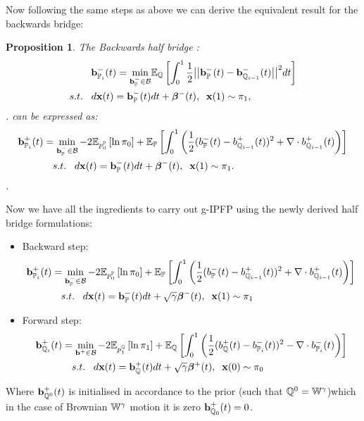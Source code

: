 \documentclass[a4paper,12pt,twoside,openright]{report}
\newtheorem{proposition}{Proposition}
\theoremstyle{definition}
\begin{document}
Now following the same steps as above we can derive the equivalent result for the backwards bridge:
\begin{proposition}
The Backwards half bridge :
\begin{align*} 
   {\mathbf{b}}^{-}_{{\mathbb{P}}_{i}}(t) =\min_{{\mathbf{b}}_{{\mathbb{P}}}^{-} \in {\mathcal{B}} } & \mathbb{E}_{\mathbb{Q}}\left[\int_0^1 \frac{1}{2}\big|\big|{\mathbf{b}}_{\mathbb{P}}^{-}(t) -{\mathbf{b}}^{-}_{{\mathbb{Q}}_{i-1}}(t)\big|\big|^2 dt\right] \nonumber \\
    s.t.\;\;\; d{\mathbf{x}}(t) = {\mathbf{b}}_{\mathbb{P}}^{-}(t) &dt +  {\bm{\beta}}^{-}(t), \;\; {\mathbf{x}}(1) \sim \pi_1,
\end{align*}.
can be expressed as:
\begin{align} \label{eq:div_control_backward}
   {\mathbf{b}}^{+}_{{\mathbb{P}}_{i}}(t) =\min_{{\mathbf{b}}_{\mathbb{P}}^{-} \in {\mathcal{B}} } -2\mathbb{E}_{p^{{\mathbb{P}}}_0}\left[\operatorname{ln} \pi_0 \right] &+ \mathbb{E}_{{\mathbb{P}}}\left[\int_0^1 \left(\frac{1}{2}(b_{\mathbb{P}}^{-}(t) - b_{{\mathbb{Q}}_{i-1}}^{+}(t))^2 + \nabla\cdot b^{+}_{{\mathbb{Q}}_{i-1}}(t) \right)\right] \nonumber \\
    s.t.\;\;\; d{\mathbf{x}}(t) = {\mathbf{b}}_{\mathbb{P}}^{-}(t) &dt +  {\bm{\beta}}^{-}(t), \;\; {\mathbf{x}}(1) \sim \pi_1.
\end{align}.
\end{proposition}
Now we have all the ingredients to carry out g-IPFP using the newly derived half bridge formulations:
\begin{itemize}
    \item Backward step:
    \begin{align*}
   {\mathbf{b}}^{+}_{{\mathbb{P}}_{i}}(t) =\min_{{\mathbf{b}}_{\mathbb{P}}^{-} \in {\mathcal{B}} } -2\mathbb{E}_{p^{{\mathbb{P}}}_0}\left[\operatorname{ln} \pi_0 \right] &+ \mathbb{E}_{{\mathbb{P}}}\left[\int_0^1 \left(\frac{1}{2}(b_{\mathbb{P}}^{-}(t) - b_{{\mathbb{Q}}_{i-1}}^{+}(t))^2 + \nabla\cdot b^{+}_{{\mathbb{Q}}_{i-1}}(t) \right)\right] \nonumber \\
    s.t.\;\;\; d{\mathbf{x}}(t) = {\mathbf{b}}_{\mathbb{P}}^{-}(t) &dt + \sqrt{\gamma} {\bm{\beta}}^{-}(t), \;\; {\mathbf{x}}(1) \sim \pi_1
    \end{align*}
    \item Forward step:
    \begin{align*} 
   {\mathbf{b}}^{+}_{{\mathbb{Q}}_{i}}(t) =\min_{{\mathbf{b}}^{+} \in {\mathcal{B}} } -2\mathbb{E}_{p^{{\mathbb{Q}}}_1}\left[\operatorname{ln} \pi_1 \right] &+ \mathbb{E}_{{\mathbb{Q}}}\left[\int_0^1 \left(\frac{1}{2}(b_{\mathbb{Q}}^{+}(t) - b_{{\mathbb{P}}_{i}}^{-}(t))^2 - \nabla\cdot b^{-}_{{\mathbb{P}}_{i}}(t) \right)\right] \nonumber \\
    s.t.\;\;\; d{\mathbf{x}}(t) = {\mathbf{b}}_{\mathbb{Q}}^{+}(t) &dt + \sqrt{\gamma} {\bm{\beta}}^{+}(t), \;\; {\mathbf{x}}(0) \sim \pi_0
    \end{align*}
\end{itemize}
Where ${\mathbf{b}}^{+}_{{\mathbb{Q}}^{0}}(t)$  is initialised in accordance to the prior (such that ${\mathbb{Q}}^0=\mathbb{W}^\gamma$)which in the case of Brownian $\mathbb{W}^\gamma$ motion it is zero ${\mathbf{b}}^{+}_{{\mathbb{Q}}_{0}}(t) =0$.
\end{document}
